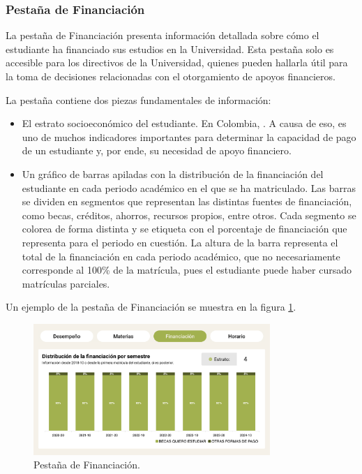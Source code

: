 \subsubsection{Pestaña de Financiación}

La pestaña de Financiación presenta información detallada sobre cómo el estudiante ha financiado sus estudios en la Universidad. Esta pestaña solo es accesible para los directivos de la Universidad, quienes pueden hallarla útil para la toma de decisiones relacionadas con el otorgamiento de apoyos financieros.

La pestaña contiene dos piezas fundamentales de información: 
\begin{itemize}
  \item El estrato socioeconómico del estudiante. En Colombia,  \cite{estrato}. A causa de eso, es uno de muchos indicadores importantes para determinar la capacidad de pago de un estudiante y, por ende, su necesidad de apoyo financiero.
  \item Un gráfico de barras apiladas con la distribución de la financiación del estudiante en cada periodo académico en el que se ha matriculado. Las barras se dividen en segmentos que representan las distintas fuentes de financiación, como becas, créditos, ahorros, recursos propios, entre otros. Cada segmento se colorea de forma distinta y se etiqueta con el porcentaje de financiación que representa para el periodo en cuestión. La altura de la barra representa el total de la financiación en cada periodo académico, que no necesariamente corresponde al 100\% de la matrícula, pues el estudiante puede haber cursado matrículas parciales.
\end{itemize}
Un ejemplo de la pestaña de Financiación se muestra en la figura \ref{fig:financiacion}.

\begin{figure}[H]
  \centering
  \includegraphics[width=0.8\textwidth]{img/nes/financiacion.png}
  \caption{Pestaña de Financiación.}
  \label{fig:financiacion}
\end{figure}

